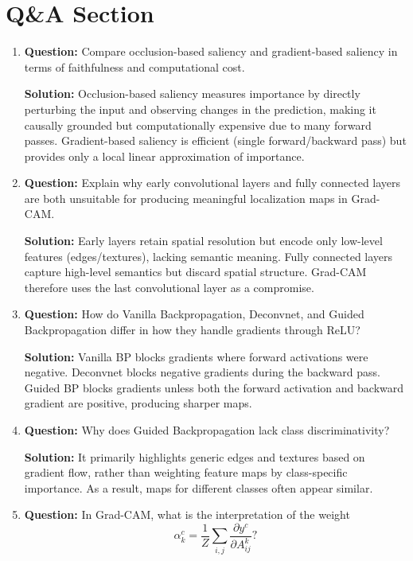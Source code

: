 \documentclass{article}
\begin{document}
\section{Q\&A Section}

\begin{enumerate}

\item \textbf{Question:}
Compare occlusion-based saliency and gradient-based saliency in terms of
faithfulness and computational cost.

\textbf{Solution:}
Occlusion-based saliency measures importance by directly perturbing the input
and observing changes in the prediction, making it causally grounded but
computationally expensive due to many forward passes.  
Gradient-based saliency is efficient (single forward/backward pass) but
provides only a local linear approximation of importance.

\item \textbf{Question:}
Explain why early convolutional layers and fully connected layers are both
unsuitable for producing meaningful localization maps in Grad-CAM.

\textbf{Solution:}
Early layers retain spatial resolution but encode only low-level features
(edges/textures), lacking semantic meaning.  
Fully connected layers capture high-level semantics but discard spatial
structure.  
Grad-CAM therefore uses the last convolutional layer as a compromise.

\item \textbf{Question:}
How do Vanilla Backpropagation, Deconvnet, and Guided Backpropagation differ
in how they handle gradients through ReLU?

\textbf{Solution:}
Vanilla BP blocks gradients where forward activations were negative.  
Deconvnet blocks negative gradients during the backward pass.  
Guided BP blocks gradients unless both the forward activation and backward
gradient are positive, producing sharper maps.

\item \textbf{Question:}
Why does Guided Backpropagation lack class discriminativity?

\textbf{Solution:}
It primarily highlights generic edges and textures based on gradient flow,
rather than weighting feature maps by class-specific importance.  
As a result, maps for different classes often appear similar.

\item \textbf{Question:}
In Grad-CAM, what is the interpretation of the weight
\[
\alpha_k^c = \frac{1}{Z} \sum_{i,j} \frac{\partial y^c}{\partial A_{ij}^k} ?
\]


\end{enumerate}
\end{document}
